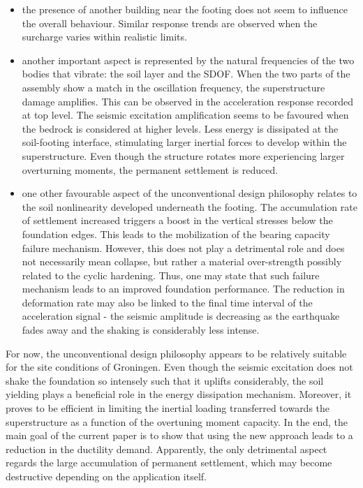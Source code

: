 \begin{itemize}
	\item the presence of another building near the footing does not seem to influence the overall behaviour. Similar response trends are observed when the surcharge varies within realistic limits.
	\item another important aspect is represented by the natural frequencies of the two bodies that vibrate: the soil layer and the SDOF. When the two parts of the assembly show a match in the oscillation frequency, the superstructure damage amplifies. This can be observed in the acceleration response recorded at top level. The seismic excitation amplification seems to be favoured when the bedrock is considered at higher levels. Less energy is dissipated at the soil-footing interface, stimulating larger inertial forces to develop within the superstructure. Even though the structure rotates more experiencing larger overturning moments, the permanent settlement is reduced.
	\item one other favourable aspect of the unconventional design philosophy relates to the soil nonlinearity developed underneath the footing. The accumulation rate of settlement increased triggers a boost in the vertical stresses below the foundation edges. This leads to the mobilization of the bearing capacity failure mechanism. However, this does not play a detrimental role and does not necessarily mean collapse, but rather a material over-strength possibly related to the cyclic hardening. Thus, one may state that such failure mechanism leads to an improved foundation performance. The reduction in deformation rate may also be linked to the final time interval of the acceleration signal - the seismic amplitude is decreasing as the earthquake fades away and the shaking is considerably less intense. 
\end{itemize}


For now, the unconventional design philosophy appears to be relatively suitable for the site conditions of Groningen. Even though the seismic excitation does not shake the foundation so intensely such that it uplifts considerably, the soil yielding plays a beneficial role in the energy dissipation mechanism. Moreover, it proves to be efficient in limiting the inertial loading transferred towards the superstructure as a function of the overtuning moment capacity. In the end, the main goal of the current paper is to show that using the new approach leads to a reduction in the ductility demand. Apparently, the only detrimental aspect regards the large accumulation of permanent settlement, which may become destructive depending on the application itself.

